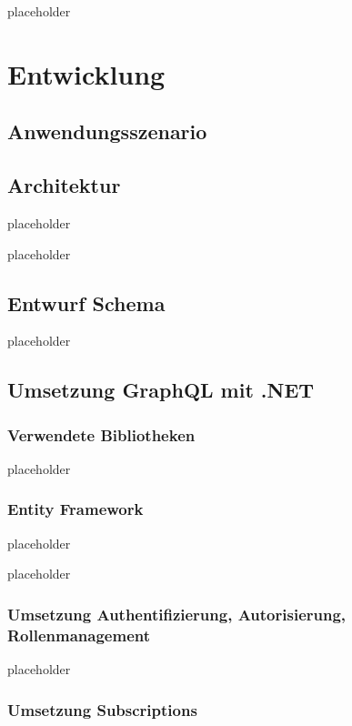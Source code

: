\documentclass[bachelor, german ]{hgbthesis}
\begin{document}
placeholder
\pagebreak

\chapter{Entwicklung}

\section{Anwendungsszenario}

\section{Architektur}

placeholder
\pagebreak

placeholder
\pagebreak

\section{Entwurf Schema}

placeholder
\pagebreak

\section{Umsetzung GraphQL mit .NET}

\subsection{Verwendete Bibliotheken}

placeholder
\pagebreak

\subsection{Entity Framework}

placeholder
\pagebreak

placeholder
\pagebreak

\subsection{Umsetzung Authentifizierung, Autorisierung, Rollenmanagement}

placeholder
\pagebreak

\subsection{Umsetzung Subscriptions}
\end{document}
